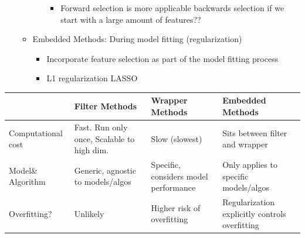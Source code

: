 \documentclass[10pt, oneside]{article}
\begin{document}
\begin{itemize}
\begin{itemize}
\begin{itemize}
\begin{itemize}
                \item Forward selection is more applicable backwards selection if we start with a large amount of features??
            \end{itemize}
        \end{itemize}
        \item Embedded Methods: During model fitting (regularization)
        \begin{itemize}
            \item Incorporate feature selection as part of the model fitting process
            \item L1 regularization LASSO
        \end{itemize}
    \end{itemize}
\end{itemize}
\begin{tabular}{|p{4cm}|p{3.5cm}|p{3.5cm}|p{3.5cm}|}
    \hline
    &Filter Methods & Wrapper Methods & Embedded Methods  \\
    \hline
    Computational cost&Fast. Run only once, Scalable to high dim.&Slow (slowest)&Sits between filter and wrapper \\
    \hline
    Model\& Algorithm&Generic, agnostic to models/algos&Specific, considers model performance& Only applies to specific models/algos\\
    \hline
    Overfitting? & Unlikely&Higher risk of overfitting&Regularization explicitly controls overfitting\\
    \hline
\end{tabular}
\end{document}
